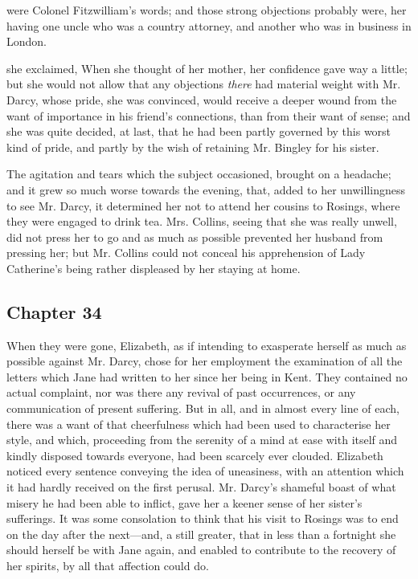  were Colonel Fitzwilliam's words; and those strong objections probably were, her having one uncle who was a country attorney, and another who was in business in London.

 she exclaimed,  When she thought of her mother, her confidence gave way a little; but she would not allow that any objections {\em there} had material weight with Mr. Darcy, whose pride, she was convinced, would receive a deeper wound from the want of importance in his friend's connections, than from their want of sense; and she was quite decided, at last, that he had been partly governed by this worst kind of pride, and partly by the wish of retaining Mr. Bingley for his sister.

The agitation and tears which the subject occasioned, brought on a headache; and it grew so much worse towards the evening, that, added to her unwillingness to see Mr. Darcy, it determined her not to attend her cousins to Rosings, where they were engaged to drink tea. Mrs. Collins, seeing that she was really unwell, did not press her to go and as much as possible prevented her husband from pressing her; but Mr. Collins could not conceal his apprehension of Lady Catherine's being rather displeased by her staying at home.

\subsection[chapter-34]{\useURL[url34][][][]\from[url34] Chapter 34}

When they were gone, Elizabeth, as if intending to exasperate herself as much as possible against Mr. Darcy, chose for her employment the examination of all the letters which Jane had written to her since her being in Kent. They contained no actual complaint, nor was there any revival of past occurrences, or any communication of present suffering. But in all, and in almost every line of each, there was a want of that cheerfulness which had been used to characterise her style, and which, proceeding from the serenity of a mind at ease with itself and kindly disposed towards everyone, had been scarcely ever clouded. Elizabeth noticed every sentence conveying the idea of uneasiness, with an attention which it had hardly received on the first perusal. Mr. Darcy's shameful boast of what misery he had been able to inflict, gave her a keener sense of her sister's sufferings. It was some consolation to think that his visit to Rosings was to end on the day after the next---and, a still greater, that in less than a fortnight she should herself be with Jane again, and enabled to contribute to the recovery of her spirits, by all that affection could do.

